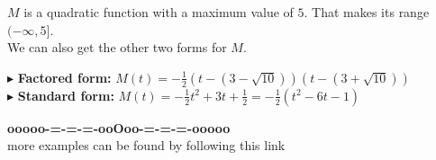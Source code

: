 \documentclass{ximera}
\begin{document}
\begin{example}
$M$ is a quadratic function with a maximum value of $5$.  That makes its range $(-\infty, 5]$. \\









We can also get the other two forms for $M$.


$\blacktriangleright$ \textbf{Factored form: }  $M(t) = -\frac{1}{2} (t - (3 - \sqrt{10})) (t - (3 + \sqrt{10}))$ \\

$\blacktriangleright$ \textbf{Standard form: }  $M(t) =  -\frac{1}{2} t^2 + 3t + \frac{1}{2} = -\frac{1}{2}(t^2-6t-1)$




\end{example}
















\begin{center}
\textbf{\textcolor{green!50!black}{ooooo-=-=-=-ooOoo-=-=-=-ooooo}} \\

more examples can be found by following this link\\ 

\end{center}
\end{document}
